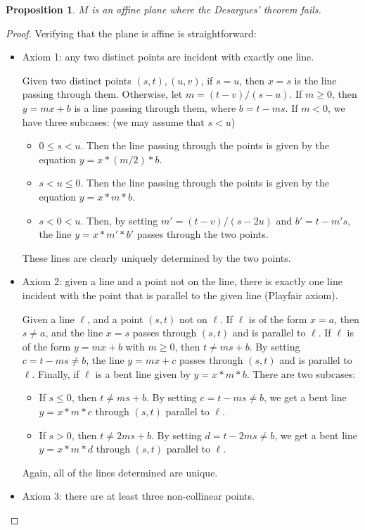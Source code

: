 \documentclass[12pt]{article}
\newtheorem{prop}{Proposition}
\begin{document}
\begin{prop} $M$ is an affine plane where the Desargues' theorem fails. \end{prop}
\begin{proof}  Verifying that the plane is affine is straightforward:
\begin{itemize}
\item Axiom 1: any two distinct points are incident with exactly one line.

Given two distinct points $(s,t),(u,v)$, if $s=u$, then $x=s$ is the line passing through them.  Otherwise, let $m=(t-v)/(s-u)$.  If $m\ge 0$, then $y=mx+b$ is a line passing through them, where $b=t-ms$.  If $m<0$, we have three subcases: (we may assume that $s<u$)
\begin{itemize}
\item $0\le s<u$.  Then the line passing through the points is given by the equation $y=x*(m/2)*b$.
\item $s<u\le 0$.  Then the line passing through the points is given by the equation $y=x*m*b$.
\item $s<0<u$.  Then, by setting $m'=(t-v)/(s-2u)$ and $b'=t-m's$, the line $y=x*m'*b'$ passes through the two points.
\end{itemize}
These lines are clearly uniquely determined by the two points.
\item Axiom 2:  given a line and a point not on the line, there is exactly one line incident with the point that is parallel to the given line (Playfair axiom).

Given a line $\ell$, and a point $(s,t)$ not on $\ell$.  If $\ell$ is of the form $x=a$, then $s\ne a$, and the line $x=s$ passes through $(s,t)$ and is parallel to $\ell$.  If $\ell$ is of the form $y=mx+b$ with $m\ge 0$, then $t\ne ms+b$.  By setting $c=t-ms \ne b$, the line $y=mx+c$ passes through $(s,t)$ and is parallel to $\ell$.  Finally, if $\ell$ is a bent line given by $y=x*m*b$.  There are two subcases:
\begin{itemize}
\item If $s\le 0$, then $t\ne ms+b$.  By setting $c=t-ms \ne b$, we get a bent line $y=x*m*c$ through $(s,t)$ parallel to $\ell$.  
\item If $s>0$, then $t\ne 2ms+b$.  By setting $d=t-2ms\ne b$, we get a bent line $y=x*m*d$ through $(s,t)$ parallel to $\ell$.
\end{itemize}
Again, all of the lines determined are unique.
\item Axiom 3: there are at least three non-collinear points.


\end{itemize}
\end{proof}
\end{document}
